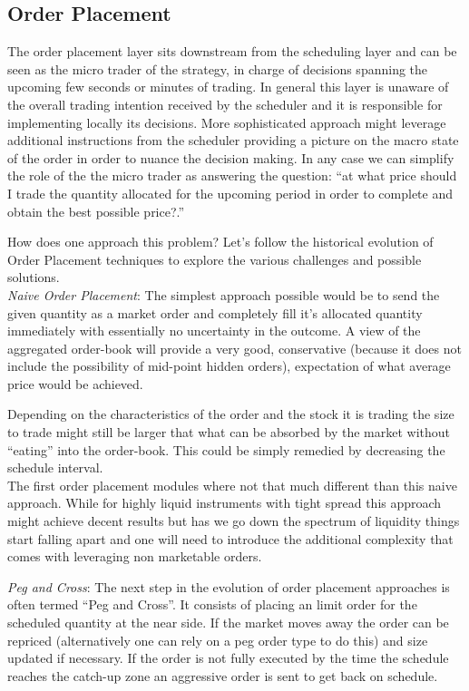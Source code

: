 \subsection{Order Placement}

The order placement layer sits downstream from the scheduling layer and can be seen as the micro trader of the strategy, in charge of decisions spanning the upcoming few seconds or minutes of trading. In general this layer is unaware of the overall trading intention received by the scheduler and it is responsible for implementing locally its decisions. More sophisticated approach might leverage  additional instructions from the scheduler providing a picture on the macro state of the order in  order to nuance the decision making. In any case we can simplify the role of the the micro trader as answering the question: ``at what price should I trade the quantity allocated for the upcoming period in order to complete and obtain the best possible price?.'' 

How does one approach this problem? Let's follow the historical evolution of Order Placement techniques to explore the various challenges and possible solutions.
\\

\noindent\emph{Naive Order Placement}:
The simplest approach possible would be to send the given quantity as a market order and completely fill it's allocated quantity immediately with essentially no uncertainty in the outcome. A view of the aggregated order-book will provide a very good, conservative (because it does not include the possibility of mid-point hidden orders), expectation of what average price would be achieved. 

Depending  on the characteristics of the order and the stock it is trading the size to trade might still be larger that what can be absorbed by the market without ``eating'' into the order-book. This could be simply remedied by decreasing the schedule interval. \\

The first order placement modules where not that much different than this naive approach. While for highly liquid instruments with tight spread this approach might achieve decent results but has we go down the spectrum of liquidity things start falling apart and one will need to introduce the additional complexity that comes with leveraging non marketable orders.

\noindent\emph{Peg and Cross}: 
The next step in the evolution of order placement approaches is often termed ``Peg and Cross''. It consists of placing an limit order  for the scheduled quantity at the near side. If the market moves away the order can be repriced (alternatively one can rely on a peg order type to do this) and size updated if necessary. If the order is not fully executed by the time the schedule reaches the catch-up zone an aggressive order is sent to get back on schedule.

